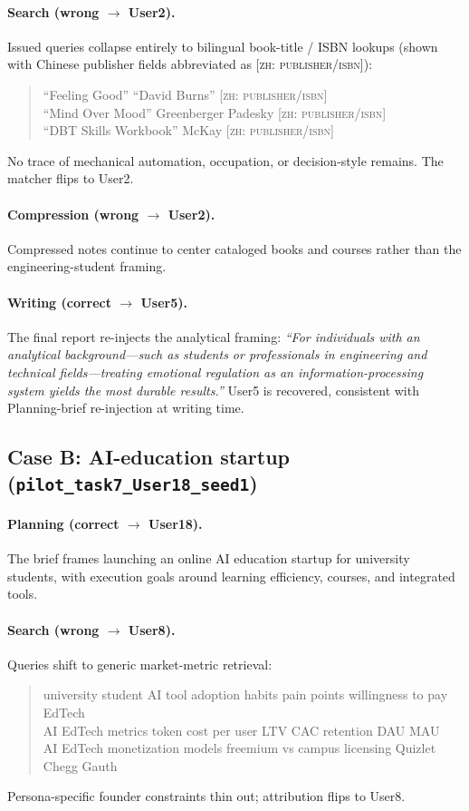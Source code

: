 \documentclass[]{article}
\begin{document}
\paragraph{Search (wrong $\to$ User2).}
Issued queries collapse entirely to bilingual book-title / ISBN lookups (shown
with Chinese publisher fields abbreviated as \textsc{[zh: publisher/isbn]}):
\begin{quote}\small\ttfamily
``Feeling Good'' ``David Burns'' \textsc{[zh: publisher/isbn]}\\
``Mind Over Mood'' Greenberger Padesky \textsc{[zh: publisher/isbn]}\\
``DBT Skills Workbook'' McKay \textsc{[zh: publisher/isbn]}
\end{quote}
No trace of mechanical automation, occupation, or decision-style remains.
The matcher flips to User2.

\paragraph{Compression (wrong $\to$ User2).}
Compressed notes continue to center cataloged books and courses rather than the
engineering-student framing.

\paragraph{Writing (correct $\to$ User5).}
The final report re-injects the analytical framing:
\emph{``For individuals with an analytical background---such as students or
professionals in engineering and technical fields---treating emotional
regulation as an information-processing system yields the most durable
results.''}
User5 is recovered, consistent with Planning-brief re-injection at writing time.

\subsection*{Case B: AI-education startup (\texttt{pilot\_task7\_User18\_seed1})}

\paragraph{Planning (correct $\to$ User18).}
The brief frames launching an online AI education startup for university
students, with execution goals around learning efficiency, courses, and
integrated tools.

\paragraph{Search (wrong $\to$ User8).}
Queries shift to generic market-metric retrieval:
\begin{quote}\small\ttfamily
university student AI tool adoption habits pain points willingness to pay EdTech\\
AI EdTech metrics token cost per user LTV CAC retention DAU MAU\\
AI EdTech monetization models freemium vs campus licensing Quizlet Chegg Gauth
\end{quote}
Persona-specific founder constraints thin out; attribution flips to User8.
\end{document}
